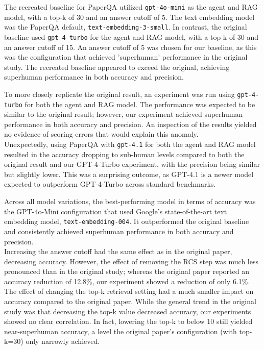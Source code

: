 The recreated baseline for PaperQA utilized \texttt{gpt-4o-mini} as the agent and RAG model, with a top-k of 30 and an answer cutoff of 5. The text embedding model was the PaperQA default, \texttt{text-embedding-3-small}. In contrast, the original baseline used \texttt{gpt-4-turbo} for the agent and RAG model, with a top-k of 30 and an answer cutoff of 15. An answer cutoff of 5 was chosen for our baseline, as this was the configuration that achieved 'superhuman' performance in the original study. The recreated baseline appeared to exceed the original, achieving superhuman performance in both accuracy and precision. 

To more closely replicate the original result, an experiment was run using \texttt{gpt-4-turbo} for both the agent and RAG model. The performance was expected to be similar to the original result; however, our experiment achieved superhuman performance in both accuracy and precision. An inspection of the results yielded no evidence of scoring errors that would explain this anomaly. \\

Unexpectedly, using PaperQA with \texttt{gpt-4.1} for both the agent and RAG model resulted in the accuracy dropping to sub-human levels compared to both the original result and our GPT-4-Turbo experiment, with the precision being similar but slightly lower. This was a surprising outcome, as GPT-4.1 is a newer model expected to outperform GPT-4-Turbo across standard benchmarks. 

Across all model variations, the best-performing model in terms of accuracy was the GPT-4o-Mini configuration that used Google's state-of-the-art text embedding model, \texttt{text-embedding-004}. It outperformed the original baseline and consistently achieved superhuman performance in both accuracy and precision. \\

Increasing the answer cutoff had the same effect as in the original paper, decreasing accuracy. However, the effect of removing the RCS step was much less pronounced than in the original study; whereas the original paper reported an accuracy reduction of 12.8\%, our experiment showed a reduction of only 6.1\%.\\

The effect of changing the top-k retrieval setting had a much smaller impact on accuracy compared to the original paper. While the general trend in the original study was that decreasing the top-k value decreased accuracy, our experiments showed no clear correlation. In fact, lowering the top-k to below 10 still yielded near-superhuman accuracy, a level the original paper's configuration (with top-k=30) only narrowly achieved. 

